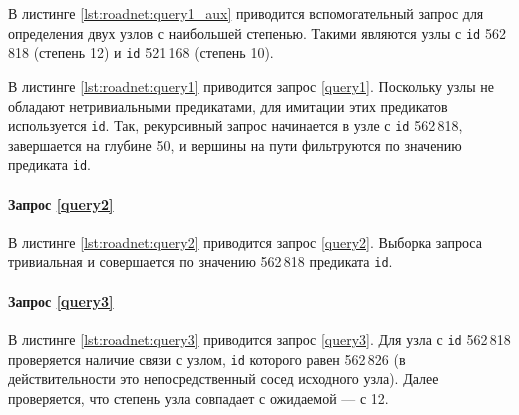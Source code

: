В листинге \ref{lst:roadnet:query1_aux} приводится вспомогательный запрос для определения двух узлов с наибольшей
степенью. Такими являются узлы с \texttt{id} 562\,818 (степень 12) и \texttt{id} 521\,168 (степень 10).


В листинге \ref{lst:roadnet:query1} приводится запрос \ref{query1}. Поскольку узлы не обладают нетривиальными
предикатами, для имитации этих предикатов используется \texttt{id}. Так, рекурсивный запрос начинается в узле с
\texttt{id} 562\,818, завершается на глубине 50, и вершины на пути фильтруются по значению предиката \texttt{id}.


\paragraph{Запрос \ref{query2}}

В листинге \ref{lst:roadnet:query2} приводится запрос \ref{query2}. Выборка запроса тривиальная и совершается по
значению 562\,818 предиката \texttt{id}.


\paragraph{Запрос \ref{query3}}

В листинге \ref{lst:roadnet:query3} приводится запрос \ref{query3}. Для узла с \texttt{id} 562\,818 проверяется наличие
связи с узлом, \texttt{id} которого равен 562\,826 (в действительности это непосредственный сосед исходного узла). Далее
проверяется, что степень узла совпадает с ожидаемой --- с 12.

